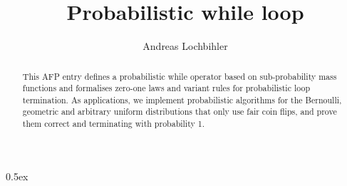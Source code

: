 \documentclass[11pt,a4paper]{article}
\begin{document}
\title{Probabilistic while loop}
\author{Andreas Lochbihler}
\maketitle

\begin{abstract}
  This AFP entry defines a probabilistic while operator based on sub-probability mass functions and formalises zero-one laws and variant rules for probabilistic loop termination.
  As applications, we implement probabilistic algorithms for the Bernoulli, geometric and arbitrary uniform distributions that only use fair coin flips, and prove them correct and terminating with probability 1.
\end{abstract}


\tableofcontents

\parindent 0pt\parskip 0.5ex





\end{document}
